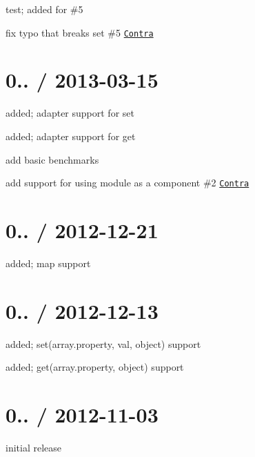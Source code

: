 \begin{DoxyItemize}
\item test; added for \#5
\item fix typo that breaks set \#5 \href{https://github.com/Contra}{\tt Contra}
\end{DoxyItemize}

\section*{0.. / 2013-\/03-\/15 }


\begin{DoxyItemize}
\item added; adapter support for set
\item added; adapter support for get
\item add basic benchmarks
\item add support for using module as a component \#2 \href{https://github.com/Contra}{\tt Contra}
\end{DoxyItemize}

\section*{0.. / 2012-\/12-\/21 }


\begin{DoxyItemize}
\item added; map support
\end{DoxyItemize}

\section*{0.. / 2012-\/12-\/13 }


\begin{DoxyItemize}
\item added; set(\textquotesingle{}array.\+property\textquotesingle{}, val, object) support
\item added; get(\textquotesingle{}array.\+property\textquotesingle{}, object) support
\end{DoxyItemize}

\section*{0.. / 2012-\/11-\/03 }


\begin{DoxyItemize}
\item initial release 
\end{DoxyItemize}
